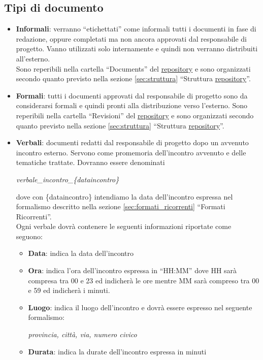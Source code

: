 \subsection{Tipi di documento}
\begin{itemize}
\item \textbf{Informali}: verranno ``etichettati'' come informali tutti i documenti in fase di redazione, oppure completati ma non ancora approvati dal responsabile di progetto. Vanno utilizzati solo internamente e quindi non verranno distribuiti all'esterno.\\
Sono reperibili nella cartella ``Documents'' del \underline{repository} e sono organizzati secondo quanto previsto nella sezione \ref{sec:struttura} ``Struttura \underline{repository}''.
\item \textbf{Formali}: tutti i documenti approvati dal responsabile di progetto sono da considerarsi formali e quindi pronti alla distribuzione verso l'esterno. Sono reperibili nella cartella ``Revisioni'' del \underline{repository} e sono organizzati secondo quanto previsto nella sezione \ref{sec:struttura} ``Struttura \underline{repository}''.
\item \textbf{Verbali}: documenti redatti dal responsabile di progetto dopo un avvenuto incontro esterno. Servono come promemoria dell'incontro avvenuto e delle tematiche trattate. Dovranno essere denominati
\begin{center}
\textit{verbale\_incontro\_\{dataincontro\}}
\end{center}
dove con \{dataincontro\} intendiamo la data dell'incontro espressa nel formalismo descritto nella sezione \ref{sec:formati_ricorrenti} ``Formati Ricorrenti''.\\
Ogni verbale dovrà contenere le seguenti informazioni riportate come seguono:
\begin{itemize}
\item \textbf{Data}: indica la data dell'incontro
\item \textbf{Ora}: indica l'ora dell'incontro espressa in ``HH:MM'' dove HH sarà compresa tra 00 e 23 ed indicherà le ore mentre MM sarà compreso tra 00 e 59 ed indicherà i minuti. 
\item \textbf{Luogo}: indica il luogo dell'incontro e dovrà essere espresso nel seguente formalismo:
\begin{center}
\textit{provincia, città, via, numero civico}
\end{center}
\item \textbf{Durata}: indica la durate dell'incontro espressa in minuti

\end{itemize}
\end{itemize}
